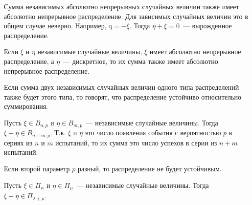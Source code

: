 \begin{remark}
  Сумма независимых абсолютно непрерывных случайных величин также имеет
  абсолютно непрерывное распределение. Для зависимых случайных величин это в
  общем случае неверно. Например, \(\eta = -\xi\). Тогда \(\eta + \xi = 0\)~---
  вырожденное распределение.
\end{remark}

\begin{remark}
  Если \(\xi\) и \(\eta\) независимые случайные величины, \(\xi\) имеет
  абсолютно непрерывное распределение, а \(\eta\)~--- дискретное, то их сумма
  также имеет абсолютно непрерывное распределение.
\end{remark}


\begin{definition}
  Если сумма двух независимых случайных величин одного типа распределений также
  будет этого типа, то говорят, что распределение устойчиво относительно
  суммирования.
\end{definition}

\begin{example}
  Пусть \(\xi \in B_{n, p}\) и \(\eta \in B_{m, p}\)~--- независимые случайные
  величины. Тогда \(\xi + \eta \in B_{n + m, p}\). Т.к. \(\xi\) и \(\eta\) это
  число появления события с вероятностью \(p\) в сериях из \(n\) и \(m\)
  испытаний, то их сумма это число успехов в серии из \(n + m\) испытаний.
\end{example}

\begin{remark}
  Если второй параметр \(p\) разный, то распределение не будет устойчивым.
\end{remark}

\begin{lemma}
  Пусть \(\xi \in \Pi_{\alpha}\) и \(\eta \in \Pi_{\mu}\)~--- независимые
  случайные величины. Тогда \(\xi + \eta \in \Pi_{\lambda + \mu}\).
\end{lemma}

